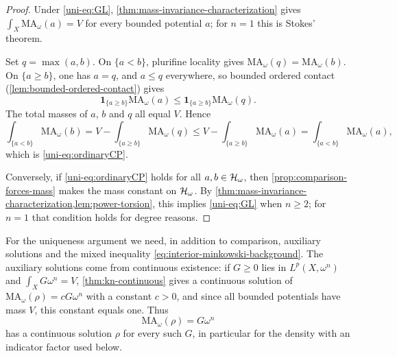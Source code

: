 \begin{proof}
Under \eqref{uni-eq:GL}, \cref{thm:mass-invariance-characterization} gives $\int_X\mathrm{MA}_\omega(a)=V$ for every bounded potential $a$; for $n=1$ this is Stokes' theorem.

Set $q=\max(a,b)$. On $\{a<b\}$, plurifine locality gives $\mathrm{MA}_\omega(q)=\mathrm{MA}_\omega(b)$. On $\{a\geq b\}$, one has $a=q$, and $a\leq q$ everywhere, so bounded ordered contact (\cref{lem:bounded-ordered-contact}) gives
\[
 \mathbf1_{\{a\geq b\}}\mathrm{MA}_\omega(a)
 \leq \mathbf1_{\{a\geq b\}}\mathrm{MA}_\omega(q).
\]
The total masses of $a$, $b$ and $q$ all equal $V$. Hence
\[
 \int_{\{a<b\}}\mathrm{MA}_\omega(b)=V-\int_{\{a\geq b\}}\mathrm{MA}_\omega(q)
 \leq V-\int_{\{a\geq b\}}\mathrm{MA}_\omega(a)=\int_{\{a<b\}}\mathrm{MA}_\omega(a),
\]
which is \eqref{uni-eq:ordinaryCP}.

Conversely, if \eqref{uni-eq:ordinaryCP} holds for all $a,b\in\mathcal H_\omega$, then \cref{prop:comparison-forces-mass} makes the mass constant on $\mathcal H_\omega$. By \cref{thm:mass-invariance-characterization,lem:power-torsion}, this implies \eqref{uni-eq:GL} when $n\geq2$; for $n=1$ that condition holds for degree reasons.
\end{proof}

For the uniqueness argument we need, in addition to comparison, auxiliary solutions and the mixed inequality \eqref{eq:interior-minkowski-background}. The auxiliary solutions come from continuous existence: if $G\geq0$ lies in $L^p(X,\omega^n)$ and $\int_XG\omega^n=V$, \cref{thm:kn-continuous} gives a continuous solution of $\mathrm{MA}_\omega(\rho)=cG\omega^n$ with a constant $c>0$, and since all bounded potentials have mass $V$, this constant equals one. Thus
\begin{equation}\label{uni-eq:aux-solvability}
 \mathrm{MA}_\omega(\rho)=G\omega^n
\end{equation}
has a continuous solution $\rho$ for every such $G$, in particular for the density with an indicator factor used below.

